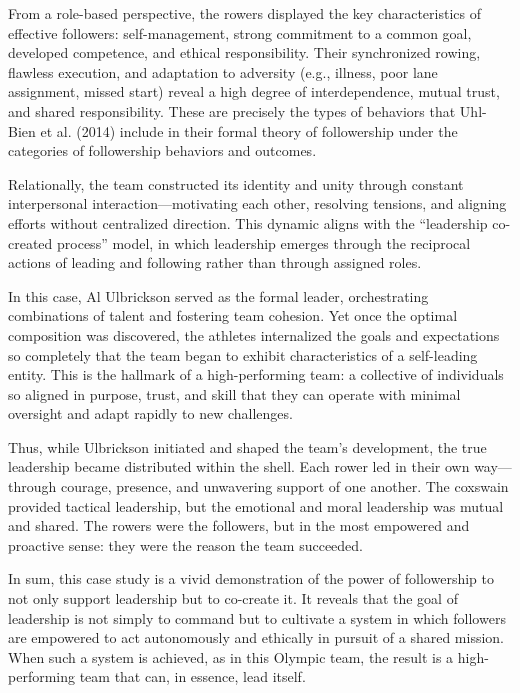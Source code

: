 \documentclass[12pt]{article}
\begin{document}
From a role-based perspective, the rowers displayed the key characteristics of effective followers: self-management, strong commitment to a common goal, developed competence, and ethical responsibility. Their synchronized rowing, flawless execution, and adaptation to adversity (e.g., illness, poor lane assignment, missed start) reveal a high degree of interdependence, mutual trust, and shared responsibility. These are precisely the types of behaviors that Uhl-Bien et al. (2014) include in their formal theory of followership under the categories of followership behaviors and outcomes.

Relationally, the team constructed its identity and unity through constant interpersonal interaction—motivating each other, resolving tensions, and aligning efforts without centralized direction. This dynamic aligns with the “leadership co-created process” model, in which leadership emerges through the reciprocal actions of leading and following rather than through assigned roles.

In this case, Al Ulbrickson served as the formal leader, orchestrating combinations of talent and fostering team cohesion. Yet once the optimal composition was discovered, the athletes internalized the goals and expectations so completely that the team began to exhibit characteristics of a self-leading entity. This is the hallmark of a high-performing team: a collective of individuals so aligned in purpose, trust, and skill that they can operate with minimal oversight and adapt rapidly to new challenges.

Thus, while Ulbrickson initiated and shaped the team’s development, the true leadership became distributed within the shell. Each rower led in their own way—through courage, presence, and unwavering support of one another. The coxswain provided tactical leadership, but the emotional and moral leadership was mutual and shared. The rowers were the followers, but in the most empowered and proactive sense: they were the reason the team succeeded.

In sum, this case study is a vivid demonstration of the power of followership to not only support leadership but to co-create it. It reveals that the goal of leadership is not simply to command but to cultivate a system in which followers are empowered to act autonomously and ethically in pursuit of a shared mission. When such a system is achieved, as in this Olympic team, the result is a high-performing team that can, in essence, lead itself.

\end{document}
